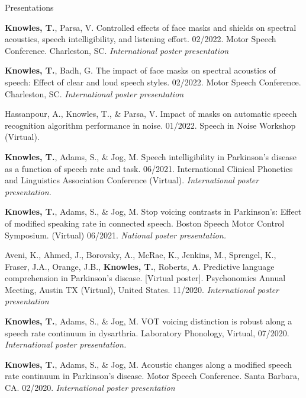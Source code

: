 \documentclass{resume} %
\begin{document}
\begin{rSection}{Presentations}
\begin{etaremune}

\item {\bf Knowles, T.}, Parsa, V. Controlled effects of face masks and shields on spectral acoustics, speech intelligibility, and listening effort. 02/2022. Motor Speech Conference. Charleston, SC. \emph{International poster presentation}

\item {\bf Knowles, T.}, Badh, G. The impact of face masks on spectral acoustics of speech: Effect of clear and loud speech styles. 02/2022. Motor Speech Conference. Charleston, SC. \emph{International poster presentation}

\item Hassanpour, A.,  Knowles, T., \& Parsa, V. Impact of masks on automatic speech recognition algorithm performance in noise. 01/2022. Speech in Noise Workshop (Virtual).

\item {\bf Knowles, T.}, Adams, S., \& Jog, M. Speech intelligibility in Parkinson's disease as a function of speech rate and task. 06/2021. International Clinical Phonetics and Linguistics Association Conference (Virtual). \emph{International poster presentation.}

\item {\bf Knowles, T.}, Adams, S., \& Jog, M. Stop voicing contrasts in Parkinson's: Effect of modified speaking rate in connected speech. Boston Speech Motor Control Symposium. (Virtual) 06/2021. \emph{National poster presentation.}

\item Aveni, K., Ahmed, J., Borovsky, A., McRae, K., Jenkins, M., Sprengel, K., Fraser, J.A., Orange, J.B., {\bf Knowles, T.}, Roberts, A. Predictive language comprehension in Parkinson’s disease. [Virtual poster]. Psychonomics Annual Meeting, Austin TX (Virtual), United States. 11/2020. \emph{International poster presentation}

\item  {\bf Knowles, T.}, Adams, S., \& Jog, M. VOT voicing distinction is robust along a speech rate continuum in dysarthria. Laboratory Phonology, Virtual, 07/2020.  \emph{International poster presentation.}
   
\item {\bf Knowles, T.}, Adams, S., \& Jog, M. Acoustic changes along a modified speech rate continuum in Parkinson's disease. Motor Speech Conference. Santa Barbara, CA. 02/2020. \emph{International poster presentation}


\end{etaremune}
\end{rSection}
\end{document}
